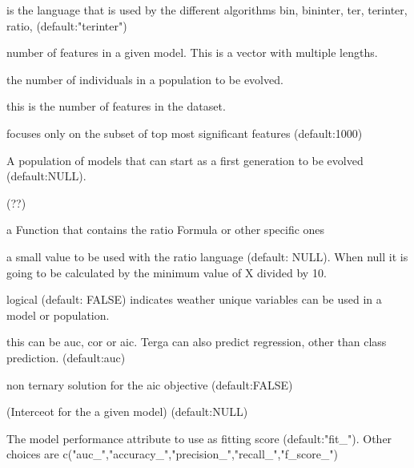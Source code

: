 \documentclass[a4paper]{book}
\begin{document}
\begin{Arguments}
\begin{ldescription}
\item[\code{language}] is the language that is used by the different algorithms bin, bininter, ter, terinter, ratio, (default:"terinter")

\item[\code{sparsity:}] number of features in a given model. This is a vector with multiple lengths.

\item[\code{size\_pop:}] the number of individuals in a population to be evolved.

\item[\code{size\_world:}] this is the number of features in the dataset.

\item[\code{max.nb.features:}] focuses only on the subset of top most significant features (default:1000)

\item[\code{popSourceFile:}] A population of models that can start as a first generation to be evolved (default:NULL).

\item[\code{popSaveFile:}] (??)

\item[\code{scoreFormula:}] a Function that contains the ratio Formula or other specific ones

\item[\code{epsilon:}] a small value to be used with the ratio language (default: NULL). When null it is going to be calculated by the minimum value of X divided by 10.

\item[\code{unique\_vars:}] logical (default: FALSE) indicates weather unique variables can be used in a model or population.

\item[\code{objective:}] this can be auc, cor or aic. Terga can also predict regression, other than class prediction. (default:auc)

\item[\code{estimate\_coefs:}] non ternary solution for the aic objective (default:FALSE)

\item[\code{intercept:}] (Interceot for the a given model) (default:NULL)

\item[\code{evalToFit:}] The model performance attribute to use as fitting score (default:"fit\_"). Other choices are c("auc\_","accuracy\_","precision\_","recall\_","f\_score\_")


\end{ldescription}
\end{Arguments}
\end{document}
